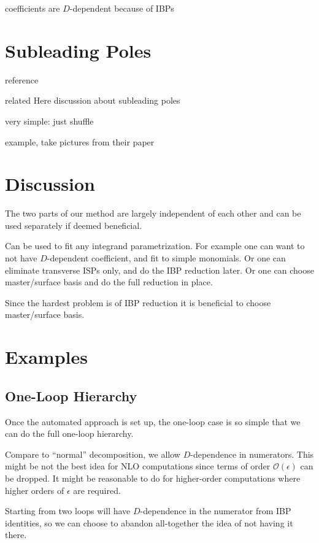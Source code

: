 coefficients are $D$-dependent because of IBPs



\section{Subleading Poles}

reference \cite{Abreu:2017idw} 

related \cite{Baumeister:2019rmh} 
Here discussion about subleading poles

very simple: just shuffle

example, take pictures from their paper


\section{Discussion}
The two parts of our method are largely independent of each other and can be used separately if deemed beneficial.

Can be used to fit any integrand parametrization. For example one
can want to not have $D$-dependent coefficient, and fit to simple monomials.
Or one can eliminate transverse ISPs only, and do the IBP reduction later.
Or one can choose master/surface basis and do the full reduction in place.

Since the hardest problem is of IBP reduction it is beneficial to choose master/surface basis.

\section{Examples}

\subsection{One-Loop Hierarchy}

Once the automated approach is set up, the one-loop case is so simple that we can
do the full one-loop hierarchy.

Compare to ``normal'' decomposition, we allow $D$-dependence in numerators. This might be not the best
idea for NLO computations since terms of order $\mathcal{O}(\epsilon)$ can be dropped.
It might be reasonable to do for higher-order computations where higher orders of $\epsilon$ are required.

Starting from two loops will have $D$-dependence in the numerator from IBP identities, so
we can choose to abandon all-together the idea of not having it there.

